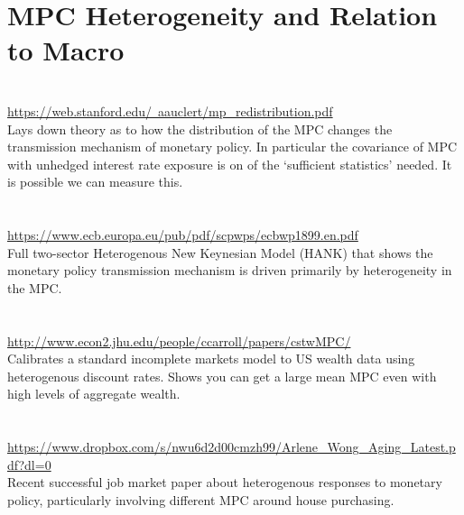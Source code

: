 \documentclass[titlepage,abstract]{econtex}
\begin{document}
\section{MPC Heterogeneity and Relation to Macro}
\cite{auclert_monetary_2015} \\
\href{url}{https://web.stanford.edu/~aauclert/mp\_redistribution.pdf} \\
Lays down theory as to how the distribution of the MPC changes the transmission mechanism of monetary policy. In particular the covariance of MPC with unhedged interest rate exposure is on of the `sufficient statistics' needed. It is possible we can measure this.\\
\\
\cite{kaplan_monetary_2016} \\
\href{url}{https://www.ecb.europa.eu/pub/pdf/scpwps/ecbwp1899.en.pdf} \\
Full two-sector Heterogenous New Keynesian Model (HANK) that shows the monetary policy transmission mechanism is driven primarily by heterogeneity in the MPC.\\
\\
\cite{carroll_distribution_2016} \\
\href{url}{http://www.econ2.jhu.edu/people/ccarroll/papers/cstwMPC/} \\
Calibrates a standard incomplete markets model to US wealth data using heterogenous discount rates. Shows you can get a large mean MPC even with high levels of aggregate wealth.\\
\\
\cite{wong_population_2016}\\
\href{url}{https://www.dropbox.com/s/nwu6d2d00cmzh99/Arlene\_Wong\_Aging\_Latest.pdf?dl=0} \\
Recent successful job market paper about heterogenous responses to monetary policy, particularly involving different MPC around house purchasing.\\
\\
\end{document}
